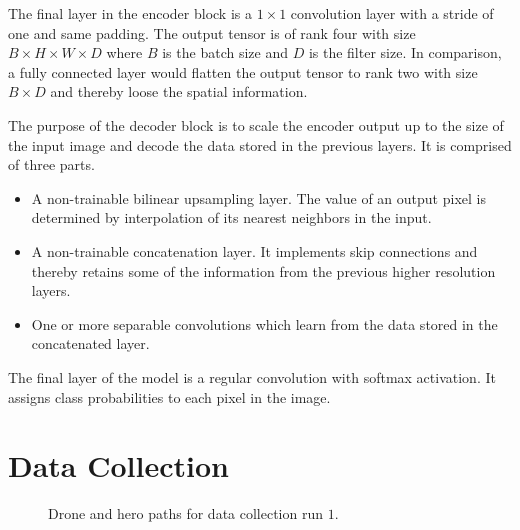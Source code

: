 \documentclass[11pt, onecolumn, oneside, reqno]{article}
\begin{document}
The final layer in the encoder block is a $1 \times 1$ convolution layer with a stride of one and same padding. The output tensor is of rank four with size $B \times H \times W \times D$ where $B$ is the batch size and $D$ is the filter size. In comparison, a fully connected layer would flatten the output tensor to rank two with size $B \times D$ and thereby loose the spatial information.

The purpose of the decoder block is to scale the encoder output up to the size of the input image and decode the data stored in the previous layers. It is comprised of three parts.
\begin{itemize}
\item A non-trainable bilinear upsampling layer. The value of an output pixel is determined by interpolation of its nearest neighbors in the input.
\item A non-trainable concatenation layer. It implements skip connections and thereby retains some of the information from the previous higher resolution layers.
\item One or more separable convolutions which learn from the data stored in the concatenated layer.
\end{itemize}

The final layer of the model is a regular convolution with softmax activation. It assigns class probabilities to each pixel in the image.

\section{Data Collection}
\label{sec:data_collection}
\begin{figure}
\noindent
{}
\caption[Paths for data collection run $1$]{Drone and hero paths for data collection run $1$.}
\label{img:data_collection_run_1}
\end{figure}
\end{document}
